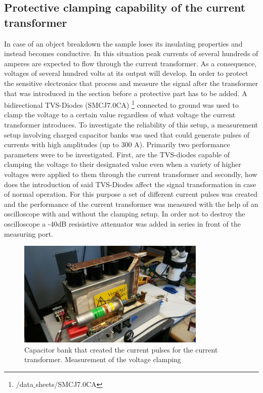 \subsection{Protective clamping capability of the current transformer}
\label{clamping}

In case of an object breakdown the sample loses its insulating properties and instead becomes conductive.
In this situation peak currents of several hundreds of amperes are expected to flow through the current transformer.
As a consequence, voltages of several hundred volts at its output will develop. In order to protect the sensitive electronics that
process and measure the signal after the transformer that was introduced in the section before a protective part has to be added.
A bidirectional TVS-Diodes (SMCJ7.0CA) \footnote{/data$\_$sheets/SMCJ7.0CA} connected to ground was used to clamp the voltage to a certain value regardless of what voltage the current transformer introduces.
To investigate the reliability of this setup, a measurement setup involving charged capacitor banks was used that could generate
pulses of currents with high amplitudes (up to 300 A). 
Primarily two performance parameters were to be investigated. First, are the TVS-diodes capable of clamping the voltage to their designated value even when
a variety of higher voltages were applied to them through the current transformer and secondly, how does the introduction of said TVS-Diodes affect the
signal transformation in case of normal operation. 
\newline
For this purpose a set of different current pulses was created and the performance of the current transformer was measured with the help of an
oscilloscope with and without the clamping setup. In order not to destroy the oscilloscope a -40dB resisistive attenuator was added in series in front of
the measuring port.

\begin{figure}[H]
\centerline{\includegraphics[width=0.8\textwidth]{figures/Method/Clamp/capacitorbank.jpg}}
    \caption{Capacitor bank that created the current pulses for the current transformer. Measurement of the voltage clamping}
    \label{fig.clamp}
\end{figure}



